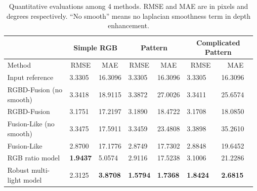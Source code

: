\begin{table}[!ht]
\caption{Quantitative evaluations among 4 methods. RMSE and MAE are in pixels and degrees respectively. ``No smooth'' means no laplacian smoothness term in depth enhancement.}
\vspace{1em}
\label{tab:comp_syn_eval}
\centering
\begin{tabular}{lllllll}
                                       & \multicolumn{2}{c}{Simple RGB}                     & \multicolumn{2}{c}{Pattern}                        & \multicolumn{2}{c}{Complicated Pattern}            \\\hline
Method                                 & \multicolumn{1}{c}{RMSE} & \multicolumn{1}{c}{MAE} & \multicolumn{1}{c}{RMSE} & \multicolumn{1}{c}{MAE} & \multicolumn{1}{c}{RMSE} & \multicolumn{1}{c}{MAE} \\\hline\hline
Input reference                              & 3.3305                   & 16.3096                 & 3.3305                   & 16.3096                 & 3.3305                   & 16.3096                 \\
RGBD-Fusion\cite{or2015rgbd} (no smooth)                       & 3.3418                   & 18.9115                 & 3.3872                   & 27.0026                 & 3.3411                   & 25.6574  		\\
RGBD-Fusion\cite{or2015rgbd} & 3.1751                   & 17.2197                 & 3.1890                   & 18.4722                 & 3.1708                   & 18.0850                 \\ 
Fusion-Like (no smooth)                  & 3.3475                   & 17.5911                 & 3.3459                   & 23.4808                 & 3.3898                   & 35.2610                 \\
Fusion-Like                        & 2.8700                   & 17.1776                 & 2.8749                   & 17.7302                 & 2.8848                   & 19.6452                 \\
RGB ratio model                        & \textbf{1.9437}          & 5.0574         & 2.9116                   & 17.5238                 & 3.1006                   & 21.2286                 \\
Robust multi-light model               & 2.3125                   & \textbf{3.8708}                  & \textbf{1.5794}          & \textbf{1.7368}         & \textbf{1.8424}          & \textbf{2.6815}  \\\hline      
\end{tabular}
\end{table}


